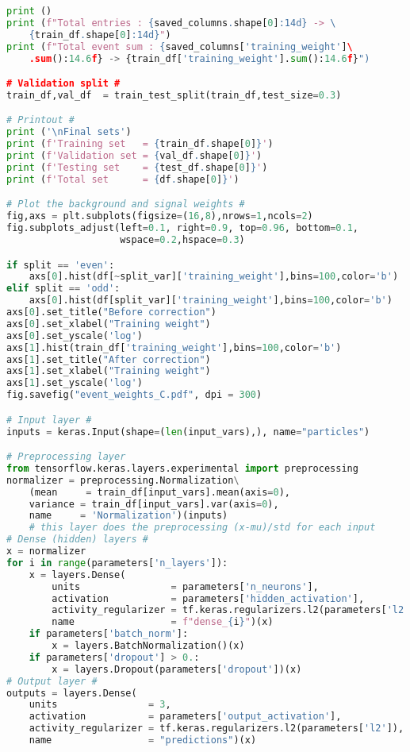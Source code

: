 \begin{lstlisting}[language=Python, caption=DNN setup for the \wwgg semi-leptonic final state, label={dnncode}]
print ()
print (f"Total entries : {saved_columns.shape[0]:14d} -> \
    {train_df.shape[0]:14d}")
print (f"Total event sum : {saved_columns['training_weight']\
    .sum():14.6f} -> {train_df['training_weight'].sum():14.6f}")

# Validation split #
train_df,val_df  = train_test_split(train_df,test_size=0.3)

# Printout #
print ('\nFinal sets')
print (f'Training set   = {train_df.shape[0]}')
print (f'Validation set = {val_df.shape[0]}')
print (f'Testing set    = {test_df.shape[0]}')
print (f'Total set      = {df.shape[0]}')

# Plot the background and signal weights #
fig,axs = plt.subplots(figsize=(16,8),nrows=1,ncols=2)
fig.subplots_adjust(left=0.1, right=0.9, top=0.96, bottom=0.1,
                    wspace=0.2,hspace=0.3)

if split == 'even':
    axs[0].hist(df[~split_var]['training_weight'],bins=100,color='b')
elif split == 'odd':
    axs[0].hist(df[split_var]['training_weight'],bins=100,color='b')
axs[0].set_title("Before correction")
axs[0].set_xlabel("Training weight")
axs[0].set_yscale('log')
axs[1].hist(train_df['training_weight'],bins=100,color='b')
axs[1].set_title("After correction")
axs[1].set_xlabel("Training weight")
axs[1].set_yscale('log')
fig.savefig("event_weights_C.pdf", dpi = 300)

# Input layer #
inputs = keras.Input(shape=(len(input_vars),), name="particles")

# Preprocessing layer
from tensorflow.keras.layers.experimental import preprocessing
normalizer = preprocessing.Normalization\
    (mean     = train_df[input_vars].mean(axis=0),
    variance = train_df[input_vars].var(axis=0),
    name     = 'Normalization')(inputs)
    # this layer does the preprocessing (x-mu)/std for each input
# Dense (hidden) layers #
x = normalizer
for i in range(parameters['n_layers']):
    x = layers.Dense(
        units                = parameters['n_neurons'], 
        activation           = parameters['hidden_activation'], 
        activity_regularizer = tf.keras.regularizers.l2(parameters['l2']),
        name                 = f"dense_{i}")(x)
    if parameters['batch_norm']:
        x = layers.BatchNormalization()(x)
    if parameters['dropout'] > 0.:
        x = layers.Dropout(parameters['dropout'])(x)
# Output layer #
outputs = layers.Dense(
    units                = 3, 
    activation           = parameters['output_activation'],
    activity_regularizer = tf.keras.regularizers.l2(parameters['l2']),
    name                 = "predictions")(x)


\end{lstlisting}
